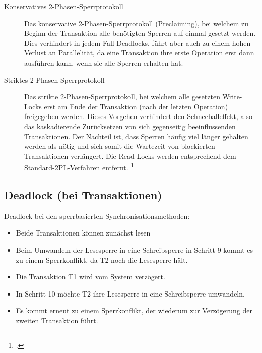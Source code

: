 \documentclass{lehramt-informatik-haupt}
\begin{document}
\begin{description}

\item[Konservatives 2-Phasen-Sperrprotokoll]

Das konservative 2-Phasen-Sperrprotokoll (Preclaiming), bei welchem zu
Beginn der Transaktion alle benötigten Sperren auf einmal gesetzt
werden. Dies verhindert in jedem Fall Deadlocks, führt aber auch zu
einem hohen Verlust an Parallelität, da eine Transaktion ihre erste
Operation erst dann ausführen kann, wenn sie alle Sperren erhalten hat.

\item[Striktes 2-Phasen-Sperrprotokoll]

Das strikte 2-Phasen-Sperrprotokoll, bei welchem alle gesetzten
Write-Locks erst am Ende der Transaktion (nach der letzten Operation)
freigegeben werden. Dieses Vorgehen verhindert den Schneeballeffekt,
also das kaskadierende Zurücksetzen von sich gegenseitig beeinflussenden
Transaktionen. Der Nachteil ist, dass Sperren häufig viel länger
gehalten werden als nötig und sich somit die Wartezeit von blockierten
Transaktionen verlängert. Die Read-Locks werden entsprechend dem
Standard-2PL-Verfahren entfernt.
\footcite{wiki:sperrverfahren}
\end{description}

%

\subsection{Deadlock (bei Transaktionen)}

Deadlock bei den sperrbasierten Synchronisationsmethoden:

\begin{itemize}
\item Beide Transaktionen können zunächst lesen

\item Beim Umwandeln der Lesesperre in eine Schreibsperre in Schritt 9
kommt es zu einem Sperrkonflikt, da T2 noch die Lesesperre hält.

\item Die Transaktion T1 wird vom System verzögert.

\item In Schritt 10 möchte T2 ihre Lesesperre in eine Schreibsperre
umwandeln.

\item Es kommt erneut zu einem Sperrkonflikt, der wiederum zur
Verzögerung der zweiten Transaktion führt.
\end{itemize}
\end{document}
